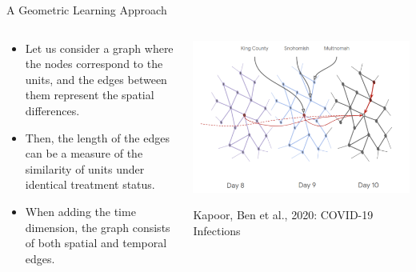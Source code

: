 \begin{frame}{A Geometric Learning Approach}

\begin{columns}
\begin{column}{0.45\linewidth}
\begin{itemize}
    \item Let us consider a graph where the nodes correspond to the units, and the edges between them represent the spatial differences. 
    \vspace{-7pt}
    \item Then, the length of the edges can be a measure of the similarity of units under identical treatment status. 
    \vspace{-7pt}
    \item When adding the time dimension, the graph consists of both spatial and temporal edges.
\end{itemize}
\end{column}
\begin{column}{0.6\linewidth}
\centering
\includegraphics[scale=0.33]{figures/gnn.png}
\caption{\footnotesize{Kapoor, Ben et al., 2020: COVID-19 Infections}}
\end{column}
\end{columns}
\end{frame}

